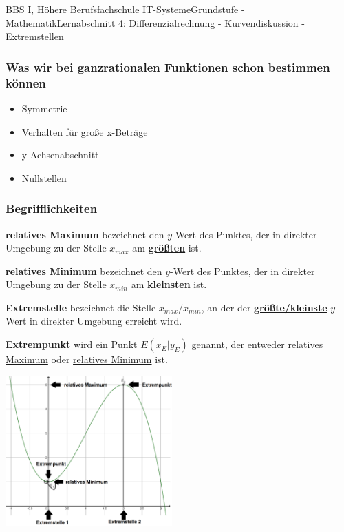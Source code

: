 \documentclass[11pt,twocolumn,oneside,openany,headings=optiontotoc,11pt,numbers=noenddot]{article}
\begin{document}
	\begin{worksheet}{BBS I, Höhere Berufsfachschule IT-Systeme}{Grundstufe - Mathematik}{Lernabschnitt 4: Differenzialrechnung - Kurvendiskussion - Extremstellen}
		\subsubsection*{Was wir bei ganzrationalen Funktionen schon bestimmen können}
		\begin{itemize}[label=-]
			\item Symmetrie
			\item Verhalten für große x-Beträge
			\item y-Achsenabschnitt
			\item Nullstellen
		\end{itemize}
		\subsubsection*{\underline{Begrifflichkeiten}}
		\textbf{relatives Maximum} bezeichnet den \(y\)-Wert des Punktes, der in direkter Umgebung zu der Stelle \(x_{max}\) am \textbf{\underline{größten}} ist.\\
		\par\noindent
		\textbf{relatives Minimum} bezeichnet den \(y\)-Wert des Punktes, der in direkter Umgebung zu der Stelle \(x_{min}\) am \underline{\textbf{kleinsten}} ist.\\
		\par\noindent
		\textbf{Extremstelle} bezeichnet die Stelle \(x_{max}/x_{min}\), an der der \textbf{\underline{größte/kleinste}} \(y\)-Wert in direkter Umgebung erreicht wird.\\
		\par\noindent
		\textbf{Extrempunkt} wird ein Punkt \(E(x_E|y_E)\) genannt, der entweder \underline{relatives Maximum} oder \underline{relatives Minimum} ist.\\
		\par\noindent
		\includegraphics[width=0.48\textwidth]{../99_Bilder/042_Beg.png}
		\setcounter{section}{7}
		\setcounter{subsection}{3}

\end{worksheet}
\end{document}
